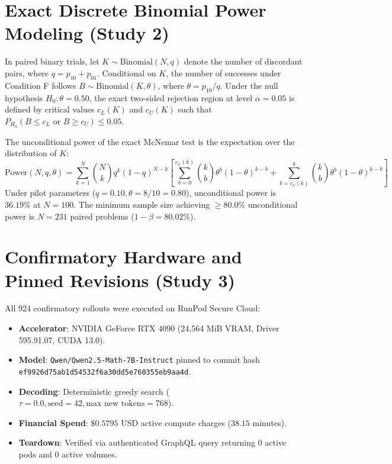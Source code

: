 \documentclass[11pt]{article}
\begin{document}
\section{Exact Discrete Binomial Power Modeling (Study 2)}
In paired binary trials, let $K \sim \text{Binomial}(N, q)$ denote the number of discordant pairs, where $q = p_{10} + p_{01}$. Conditional on $K$, the number of successes under Condition F follows $B \sim \text{Binomial}(K, \theta)$, where $\theta = p_{10} / q$. Under the null hypothesis $H_0: \theta = 0.50$, the exact two-sided rejection region at level $\alpha = 0.05$ is defined by critical values $c_L(K)$ and $c_U(K)$ such that $P_{H_0}(B \le c_L \text{ or } B \ge c_U) \le 0.05$.

The unconditional power of the exact McNemar test is the expectation over the distribution of $K$:
\begin{equation}
\text{Power}(N, q, \theta) = \sum_{k=1}^N \binom{N}{k} q^k (1-q)^{N-k} \left[ \sum_{b=0}^{c_L(k)} \binom{k}{b} \theta^b (1-\theta)^{k-b} + \sum_{b=c_U(k)}^k \binom{k}{b} \theta^b (1-\theta)^{k-b} \right]
\end{equation}
Under pilot parameters ($q = 0.10, \theta = 8/10 = 0.80$), unconditional power is $36.19\%$ at $N=100$. The minimum sample size achieving $\ge 80.0\%$ unconditional power is $N = 231$ paired problems ($1 - \beta = 80.02\%$).

\section{Confirmatory Hardware and Pinned Revisions (Study 3)}
All 924 confirmatory rollouts were executed on RunPod Secure Cloud:
\begin{itemize}
    \item \textbf{Accelerator}: NVIDIA GeForce RTX 4090 (24,564 MiB VRAM, Driver 595.91.07, CUDA 13.0).
    \item \textbf{Model}: \texttt{Qwen/Qwen2.5-Math-7B-Instruct} pinned to commit hash \texttt{ef9926d75ab1d54532f6a30dd5e760355eb9aa4d}.
    \item \textbf{Decoding}: Deterministic greedy search ($\tau = 0.0, \text{seed} = 42, \text{max new tokens} = 768$).
    \item \textbf{Financial Spend}: $\$0.5795$ USD active compute charges ($38.15$ minutes).
    \item \textbf{Teardown}: Verified via authenticated GraphQL query returning $0$ active pods and $0$ active volumes.
\end{itemize}
\end{document}
